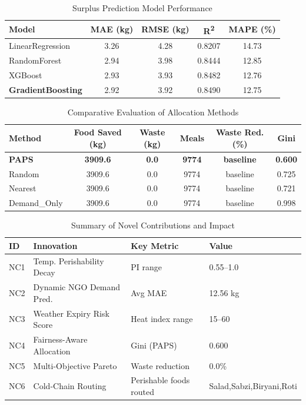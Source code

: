 \documentclass{article}
\begin{document}
\begin{table}[h]
\centering
\caption{Surplus Prediction Model Performance}
\label{tab:model_comparison}
\begin{tabular}{lcccc}
\toprule
Model & MAE (kg) & RMSE (kg) & R\textsuperscript{2} & MAPE (\%) \\
\midrule
{LinearRegression} & 3.26 & 4.28 & 0.8207 & 14.73 \\
{RandomForest} & 2.94 & 3.98 & 0.8444 & 12.85 \\
{XGBoost} & 2.93 & 3.93 & 0.8482 & 12.76 \\
\textbf{GradientBoosting} & 2.92 & 3.92 & 0.8490 & 12.75 \\
\bottomrule
\end{tabular}
\end{table}

\begin{table}[h]
\centering
\caption{Comparative Evaluation of Allocation Methods}
\label{tab:method_comparison}
\begin{tabular}{lccccc}
\toprule
Method & Food Saved (kg) & Waste (kg) & Meals & Waste Red. (\%) & Gini \\
\midrule
\textbf{PAPS} & \textbf{3909.6} & \textbf{0.0} & \textbf{9774} & \textbf{baseline} & \textbf{0.600} \\
{Random} & {3909.6} & {0.0} & {9774} & {baseline} & {0.725} \\
{Nearest} & {3909.6} & {0.0} & {9774} & {baseline} & {0.721} \\
{Demand_Only} & {3909.6} & {0.0} & {9774} & {baseline} & {0.998} \\
\bottomrule
\end{tabular}
\end{table}

\begin{table}[h]
\centering
\caption{Summary of Novel Contributions and Impact}
\label{tab:nc_summary}
\begin{tabular}{llll}
\toprule
ID & Innovation & Key Metric & Value \\
\midrule
NC1 & Temp. Perishability Decay & PI range & 0.55--1.0 \\
NC2 & Dynamic NGO Demand Pred. & Avg MAE & 12.56 kg \\
NC3 & Weather Expiry Risk Score & Heat index range & 15--60 \\
NC4 & Fairness-Aware Allocation & Gini (PAPS) & 0.600 \\
NC5 & Multi-Objective Pareto & Waste reduction & 0.0\% \\
NC6 & Cold-Chain Routing & Perishable foods routed & Salad,Sabzi,Biryani,Roti \\
\bottomrule
\end{tabular}
\end{table}
\end{document}
